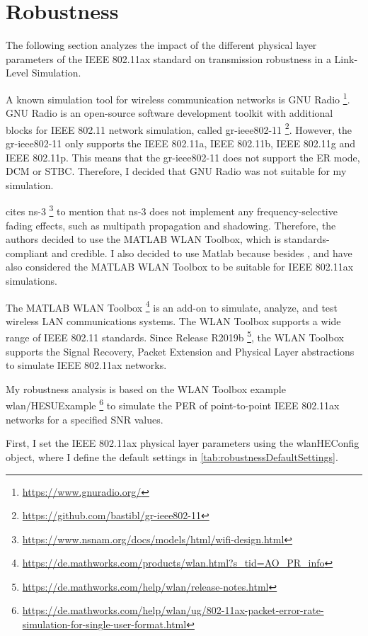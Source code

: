 \section{Robustness}
\label{sec:Robustness}
The following section analyzes the impact of the different physical layer parameters of the IEEE 802.11ax standard on transmission robustness in a
Link-Level Simulation.

A known simulation tool for wireless communication networks is GNU Radio \footnote{\url{https://www.gnuradio.org/}}.
GNU Radio is an open-source software development toolkit with additional blocks for IEEE 802.11 network simulation,
called gr-ieee802-11 \footnote{\url{https://github.com/bastibl/gr-ieee802-11}}.
However, the gr-ieee802-11 only supports the IEEE 802.11a, IEEE 802.11b, IEEE 802.11g and IEEE 802.11p.
This means that the gr-ieee802-11 does not support the \ac{ER} mode, \ac{DCM} or \ac{STBC}.
Therefore, I decided that GNU Radio was not suitable for my simulation.

\textcite{sheela_performance_2022} cites ns-3 \footnote{\url{https://www.nsnam.org/docs/models/html/wifi-design.html}} to mention
that ns-3 does not implement
any frequency-selective fading effects, such as multipath propagation and shadowing.
Therefore, the authors decided to use the MATLAB WLAN Toolbox, which is standards-compliant and credible.
I also decided to use Matlab because besides \cite{sheela_performance_2022}, \cite{cao_efficient_2022} and
\cite{jin_efficient_2021} have also considered
the MATLAB WLAN Toolbox to be suitable for IEEE 802.11ax simulations.

The MATLAB WLAN Toolbox \footnote{\url{https://de.mathworks.com/products/wlan.html?s_tid=AO_PR_info}} is an add-on to simulate, analyze, and test wireless LAN communications systems.
The WLAN Toolbox supports a wide range of IEEE 802.11 standards.
Since Release R2019b \footnote{\url{https://de.mathworks.com/help/wlan/release-notes.html}}, the WLAN Toolbox supports the Signal Recovery, Packet Extension and Physical Layer abstractions to simulate IEEE 802.11ax networks.

My robustness analysis is based on the WLAN Toolbox example wlan/HESUExample \footnote{\url{https://de.mathworks.com/help/wlan/ug/802-11ax-packet-error-rate-simulation-for-single-user-format.html}} to simulate the \ac{PER} of point-to-point IEEE 802.11ax networks for
a specified \ac{SNR} values.

First, I set the IEEE 802.11ax physical layer parameters using the wlanHEConfig object,
where I define the default settings in \autoref{tab:robustnessDefaultSettings}.

